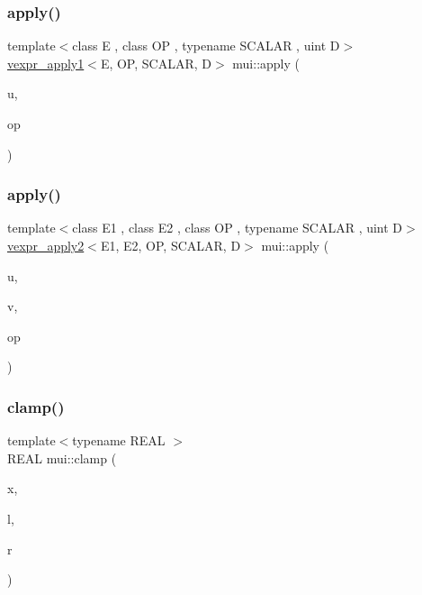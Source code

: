 \subsubsection{\texorpdfstring{apply()}{apply()}\hspace{0.1cm}{\footnotesize\ttfamily [1/2]}}
{\footnotesize\ttfamily template$<$class E , class OP , typename S\+C\+A\+L\+AR , uint D$>$ \\
\hyperlink{structmui_1_1vexpr__apply1}{vexpr\+\_\+apply1}$<$E, OP, S\+C\+A\+L\+AR, D$>$ mui\+::apply (\begin{DoxyParamCaption}\item[{\hyperlink{structmui_1_1vexpr}{vexpr}$<$ E, S\+C\+A\+L\+AR, D $>$ const \&}]{u,  }\item[{OP const \&}]{op }\end{DoxyParamCaption})\hspace{0.3cm}{\ttfamily [inline]}}

\mbox{\label{namespacemui_a8636e43027b552ba308a2da852512941}} 
\subsubsection{\texorpdfstring{apply()}{apply()}\hspace{0.1cm}{\footnotesize\ttfamily [2/2]}}
{\footnotesize\ttfamily template$<$class E1 , class E2 , class OP , typename S\+C\+A\+L\+AR , uint D$>$ \\
\hyperlink{structmui_1_1vexpr__apply2}{vexpr\+\_\+apply2}$<$E1, E2, OP, S\+C\+A\+L\+AR, D$>$ mui\+::apply (\begin{DoxyParamCaption}\item[{\hyperlink{structmui_1_1vexpr}{vexpr}$<$ E1, S\+C\+A\+L\+AR, D $>$ const \&}]{u,  }\item[{\hyperlink{structmui_1_1vexpr}{vexpr}$<$ E2, S\+C\+A\+L\+AR, D $>$ const \&}]{v,  }\item[{OP const \&}]{op }\end{DoxyParamCaption})\hspace{0.3cm}{\ttfamily [inline]}}

\mbox{\label{namespacemui_ad6e3ca675b42ee8b65ded570c858b442}} 
\subsubsection{\texorpdfstring{clamp()}{clamp()}}
{\footnotesize\ttfamily template$<$typename R\+E\+AL $>$ \\
R\+E\+AL mui\+::clamp (\begin{DoxyParamCaption}\item[{R\+E\+AL}]{x,  }\item[{R\+E\+AL}]{l,  }\item[{R\+E\+AL}]{r }\end{DoxyParamCaption})\hspace{0.3cm}{\ttfamily [inline]}}


